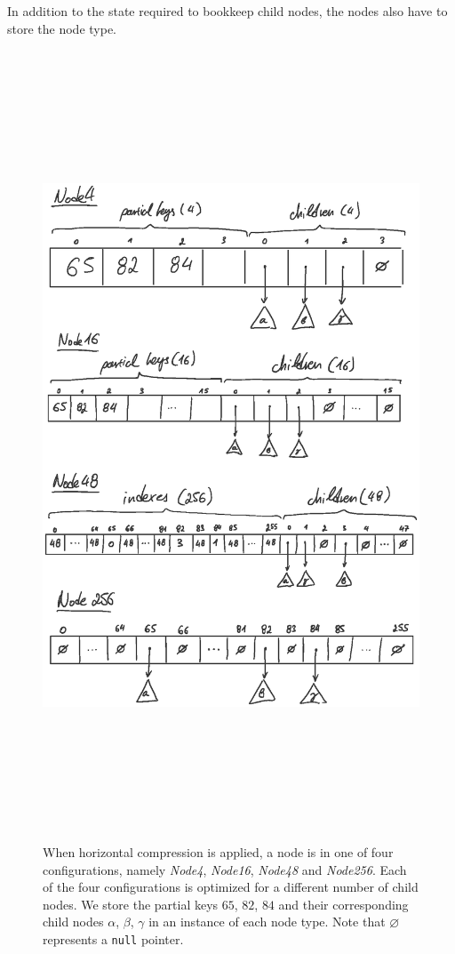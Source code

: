 \documentclass[abstracton,12pt]{scrartcl}
\theoremstyle{definition}
\begin{document}
In addition to the state required to bookkeep child nodes,
the nodes also have to store the node type.

\begin{figure}
  \vspace{-4cm}
  \centering
  \includegraphics[height=23.5cm]{art_nodes_draw}
  \vspace{-3cm}
  \caption{
    When horizontal compression is applied, a node is in one of four 
    configurations, namely \textit{Node4}, \textit{Node16}, \textit{Node48} 
    and \textit{Node256}.
    Each of the four configurations is optimized for a different number of 
    child nodes. We store the partial keys $65$, $82$, $84$ and their 
    corresponding child nodes $\alpha$, $\beta$, $\gamma$ in an instance
    of each node type. Note that $\varnothing$ represents a \texttt{null} 
    pointer.
  }
  \label{fig:horizontal-compression}
\end{figure}
\end{document}

